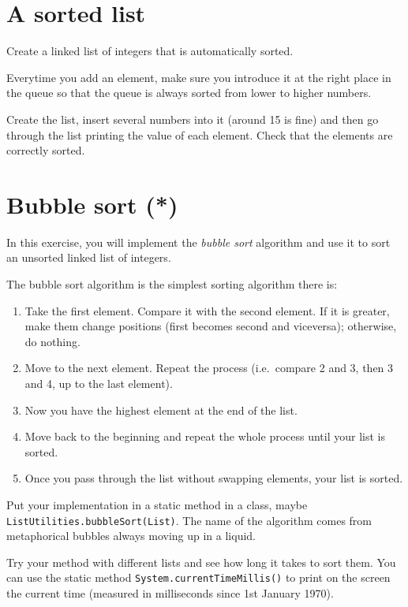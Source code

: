 \documentclass{article}
\begin{document}
\section{A sorted list}
\label{sec:sorted-list}

Create a linked list of integers that is automatically sorted. 

Everytime you add an element, make sure you introduce it at the right
place in the queue so that the queue is always sorted from lower to
higher numbers. 

Create the list, insert several numbers into it (around 15 is fine)
and then go through the list printing the value of each element. Check
that the elements are correctly sorted.


\section{Bubble sort (*)}
\label{sec:bubble-sort}

In this exercise, you will implement the \emph{bubble sort} algorithm
and use it to sort an unsorted linked list of integers. 

The bubble sort algorithm is the simplest sorting algorithm there is: 

\begin{enumerate}
\item Take the first element. Compare it with the second element. If
  it is greater, make them change positions (first becomes second and
  viceversa); otherwise, do nothing.
\item Move to the next element. Repeat the process (i.e.~compare 2 and
  3, then 3 and 4, up to the last element).
\item Now you have the highest element at the end of the list.
\item Move back to the beginning and repeat the whole process until
  your list is sorted.
\item Once you pass through the list without swapping elements, your
  list is sorted. 
\end{enumerate}

Put your implementation in a static method in a class, maybe
\verb+ListUtilities.bubbleSort(List)+. The name of the algorithm comes
from metaphorical bubbles always moving up in a liquid. 

Try your method with different lists and see how long it takes to sort
them. You can use the static method \verb+System.currentTimeMillis()+
to print on the screen the current time (measured in milliseconds
since 1st January 1970). 
\end{document}

